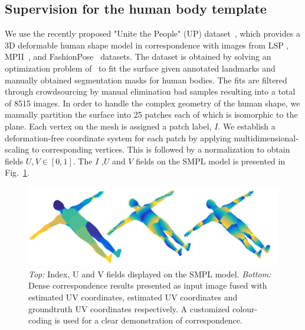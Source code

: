 \subsection{Supervision for the human body template}

We use the recently proposed "Unite the People" (UP) dataset~\cite{lassner2017unite}, which provides a 3D deformable human shape model \cite{loper2015smpl} in correspondence with images from LSP \cite{Johnson10}, MPII~\cite{andriluka14cvpr}, and FashionPose~\cite{dantone2013human} datasets. The dataset is obtained by solving an optimization problem of~\cite{bogo2016keep} to fit the surface given annotated landmarks and manually obtained segmentation masks for human bodies. The fits are filtered through crowdsourcing by manual elimination bad samples resulting into a total of 8515 images.
%
In order to handle the complex geometry of the human shape, we manually partition the surface into 25 patches each of which is isomorphic to the plane. Each vertex on the mesh is assigned a patch label, $I$. We establish a deformation-free coordinate system for each patch by applying multidimensional-scaling to corresponding vertices. This is followed by a normalization to obtain fields $U,V \in [0,1]$.  The $I$ ,$U$ and $V$ fields on the SMPL model\cite{loper2015smpl} is presented in Fig.~\ref{fig:IUV}.
%

%
 

\begin{figure}[h!]
\begin{center}
   \includegraphics[width=1 \linewidth ]{resources/Human_Poses/IUV_Figure3}
\end{center}
   \caption{ \textit{Top:} Index, U and V fields displayed on the SMPL model. \textit{Bottom:} Dense correspondence results presented as input image fused with estimated UV coordinates, estimated UV coordinates and groundtruth UV coordinates respectively. A customized colour-coding is used for a clear demonstration of correspondence.}
\label{fig:IUV}
\end{figure}

 

